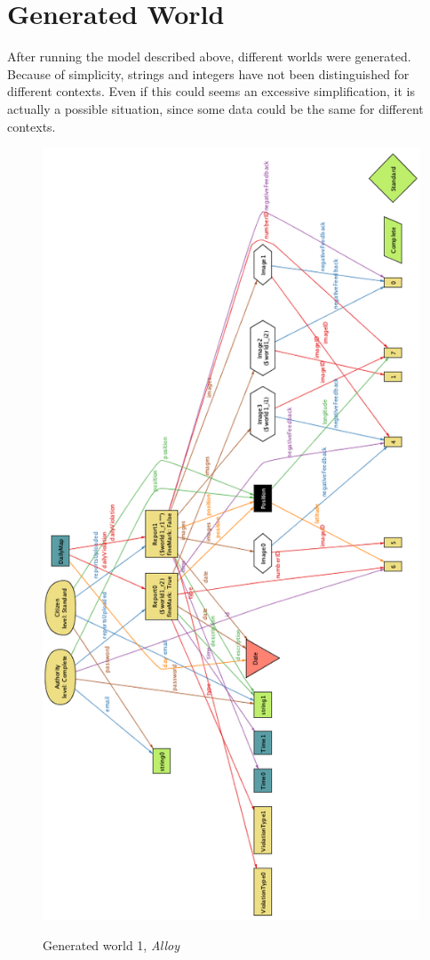 \documentclass[../RASD.tex]{subfiles}
\begin{document}
    \section{Generated World}\label{sec:generated-world}
    After running the model described above, different worlds were generated.
    Because of simplicity, strings and integers have not been distinguished for different contexts.
    Even if this could seems an excessive simplification, it is actually a possible situation, since some data could be the same for different contexts.
    \begin{figure}[H]
        \centering
        \includegraphics[scale = 0.7]{assets/world1.png}\\
        \caption[Generated world 1, \textit{Alloy}]{Generated world 1, \textit{Alloy}}
    \end{figure}
\end{document}
